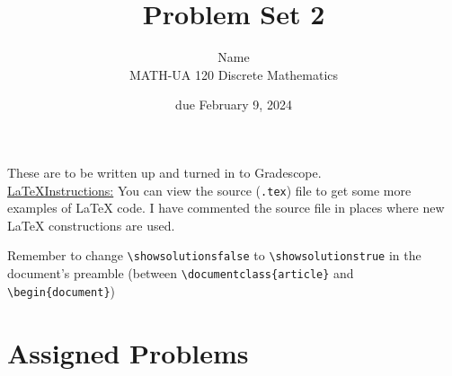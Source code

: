 \documentclass{article}
\title{Problem Set 2}
\author{%
    Name
\\  MATH-UA 120 Discrete Mathematics
}
\date{due February 9, 2024}
\newif\ifshowsolutions
\newcommand{\danger}{\marginpar[\hfill\dbend]{\dbend\hfill}}
\theoremstyle{definition}
\begin{document}
\maketitle



These are to be written up and turned in to Gradescope.\\



\ifshowsolutions
    \SetupExSheets{solution/print=true}
\else
    \danger
 \underline{ \LaTeX  Instructions:}  You can view the source (\texttt{.tex}) file to get some more examples of \LaTeX{} code.  I have commented the source file in places where new \LaTeX{} constructions are used.
  
  Remember to change \verb|\showsolutionsfalse| to \verb|\showsolutionstrue|
    in the document's preamble 
    (between \verb|\documentclass{article}| and \verb|\begin{document}|)
\fi

\section*{Assigned Problems}
\end{document}
